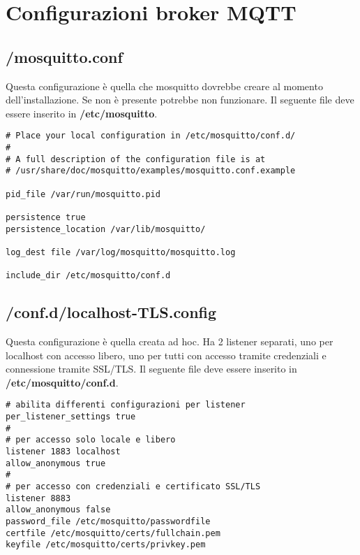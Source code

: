 

\chapter{Configurazioni broker MQTT}
\label{ch:broker-configurazioni-broker-mqtt}

\section{/mosquitto.conf}
\label{sec:/mosquitto.conf}
Questa configurazione è quella che mosquitto dovrebbe creare al momento dell'installazione.
Se non è presente potrebbe non funzionare.\newline
Il seguente file deve essere inserito in \textbf{/etc/mosquitto}.
\begin{lstlisting}[caption={mosquitto.conf},language=text]
# Place your local configuration in /etc/mosquitto/conf.d/
#
# A full description of the configuration file is at
# /usr/share/doc/mosquitto/examples/mosquitto.conf.example

pid_file /var/run/mosquitto.pid

persistence true
persistence_location /var/lib/mosquitto/

log_dest file /var/log/mosquitto/mosquitto.log

include_dir /etc/mosquitto/conf.d
\end{lstlisting}

\section{/conf.d/localhost-TLS.config}
\label{sec:/conf.d/localhost-tls.config}
Questa configurazione è quella creata ad hoc.
Ha 2 listener separati, uno per localhost con accesso libero, uno per tutti con accesso tramite
credenziali e connessione tramite SSL/TLS.\newline
Il seguente file deve essere inserito in \textbf{/etc/mosquitto/conf.d}.
\begin{lstlisting}[caption={mosquitto.conf},language=text]
# abilita differenti configurazioni per listener
per_listener_settings true
#
# per accesso solo locale e libero
listener 1883 localhost
allow_anonymous true
#
# per accesso con credenziali e certificato SSL/TLS
listener 8883
allow_anonymous false
password_file /etc/mosquitto/passwordfile
certfile /etc/mosquitto/certs/fullchain.pem
keyfile /etc/mosquitto/certs/privkey.pem
\end{lstlisting}

